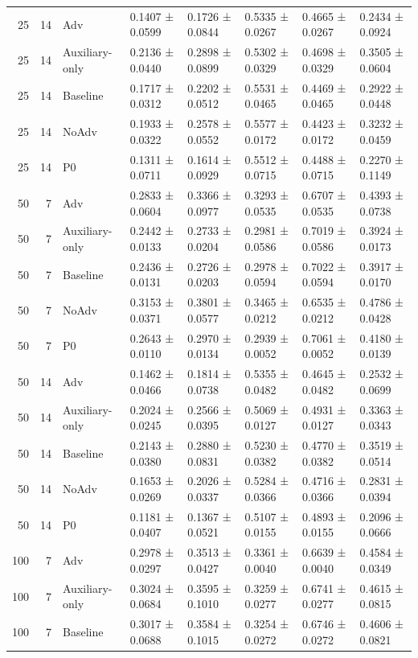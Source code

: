 \begin{table}
\begin{tabular}{rrllllll}
25 & 14 & Adv & 0.1407 ± 0.0599 & 0.1726 ± 0.0844 & 0.5335 ± 0.0267 & 0.4665 ± 0.0267 & 0.2434 ± 0.0924 \\
25 & 14 & Auxiliary-only & 0.2136 ± 0.0440 & 0.2898 ± 0.0899 & 0.5302 ± 0.0329 & 0.4698 ± 0.0329 & 0.3505 ± 0.0604 \\
25 & 14 & Baseline & 0.1717 ± 0.0312 & 0.2202 ± 0.0512 & 0.5531 ± 0.0465 & 0.4469 ± 0.0465 & 0.2922 ± 0.0448 \\
25 & 14 & NoAdv & 0.1933 ± 0.0322 & 0.2578 ± 0.0552 & 0.5577 ± 0.0172 & 0.4423 ± 0.0172 & 0.3232 ± 0.0459 \\
25 & 14 & P0 & 0.1311 ± 0.0711 & 0.1614 ± 0.0929 & 0.5512 ± 0.0715 & 0.4488 ± 0.0715 & 0.2270 ± 0.1149 \\
50 & 7 & Adv & 0.2833 ± 0.0604 & 0.3366 ± 0.0977 & 0.3293 ± 0.0535 & 0.6707 ± 0.0535 & 0.4393 ± 0.0738 \\
50 & 7 & Auxiliary-only & 0.2442 ± 0.0133 & 0.2733 ± 0.0204 & 0.2981 ± 0.0586 & 0.7019 ± 0.0586 & 0.3924 ± 0.0173 \\
50 & 7 & Baseline & 0.2436 ± 0.0131 & 0.2726 ± 0.0203 & 0.2978 ± 0.0594 & 0.7022 ± 0.0594 & 0.3917 ± 0.0170 \\
50 & 7 & NoAdv & 0.3153 ± 0.0371 & 0.3801 ± 0.0577 & 0.3465 ± 0.0212 & 0.6535 ± 0.0212 & 0.4786 ± 0.0428 \\
50 & 7 & P0 & 0.2643 ± 0.0110 & 0.2970 ± 0.0134 & 0.2939 ± 0.0052 & 0.7061 ± 0.0052 & 0.4180 ± 0.0139 \\
50 & 14 & Adv & 0.1462 ± 0.0466 & 0.1814 ± 0.0738 & 0.5355 ± 0.0482 & 0.4645 ± 0.0482 & 0.2532 ± 0.0699 \\
50 & 14 & Auxiliary-only & 0.2024 ± 0.0245 & 0.2566 ± 0.0395 & 0.5069 ± 0.0127 & 0.4931 ± 0.0127 & 0.3363 ± 0.0343 \\
50 & 14 & Baseline & 0.2143 ± 0.0380 & 0.2880 ± 0.0831 & 0.5230 ± 0.0382 & 0.4770 ± 0.0382 & 0.3519 ± 0.0514 \\
50 & 14 & NoAdv & 0.1653 ± 0.0269 & 0.2026 ± 0.0337 & 0.5284 ± 0.0366 & 0.4716 ± 0.0366 & 0.2831 ± 0.0394 \\
50 & 14 & P0 & 0.1181 ± 0.0407 & 0.1367 ± 0.0521 & 0.5107 ± 0.0155 & 0.4893 ± 0.0155 & 0.2096 ± 0.0666 \\
100 & 7 & Adv & 0.2978 ± 0.0297 & 0.3513 ± 0.0427 & 0.3361 ± 0.0040 & 0.6639 ± 0.0040 & 0.4584 ± 0.0349 \\
100 & 7 & Auxiliary-only & 0.3024 ± 0.0684 & 0.3595 ± 0.1010 & 0.3259 ± 0.0277 & 0.6741 ± 0.0277 & 0.4615 ± 0.0815 \\
100 & 7 & Baseline & 0.3017 ± 0.0688 & 0.3584 ± 0.1015 & 0.3254 ± 0.0272 & 0.6746 ± 0.0272 & 0.4606 ± 0.0821 \\

\end{tabular}
\end{table}
